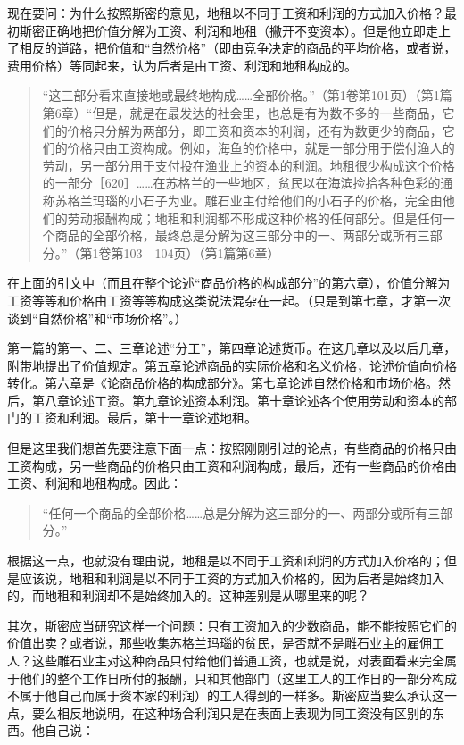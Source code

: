 现在要问：为什么按照斯密的意见，地租以不同于工资和利润的方式加入价格？最初斯密正确地把价值分解为工资、利润和地租（撇开不变资本）。但是他立即走上了相反的道路，把价值和“自然价格”（即由竞争决定的商品的平均价格，或者说，费用价格）等同起来，认为后者是由工资、利润和地租构成的。

\begin{quote}{“这三部分看来直接地或最终地构成……全部价格。”（第1卷第101页）（第1篇第6章）“但是，就是在最发达的社会里，也总是有为数不多的一些商品，它们的价格只分解为两部分，即工资和资本的利润，还有为数更少的商品，它们的价格只由工资构成。例如，海鱼的价格中，就是一部分用于偿付渔人的劳动，另一部分用于支付投在渔业上的资本的利润。地租很少构成这个价格的一部分［620］……在苏格兰的一些地区，贫民以在海滨捡拾各种色彩的通称苏格兰玛瑙的小石子为业。雕石业主付给他们的小石子的价格，完全由他们的劳动报酬构成；地租和利润都不形成这种价格的任何部分。但是任何一个商品的全部价格，最终总是分解为这三部分中的一、两部分或所有三部分。”（第1卷第103—104页）（第1篇第6章）}\end{quote}

在上面的引文中（而且在整个论述“商品价格的构成部分”的第六章），价值分解为工资等等和价格由工资等等构成这类说法混杂在一起。（只是到第七章，才第一次谈到“自然价格”和“市场价格”。）

第一篇的第一、二、三章论述“分工”，第四章论述货币。在这几章以及以后几章，附带地提出了价值规定。第五章论述商品的实际价格和名义价格，论述价值向价格转化。第六章是《论商品价格的构成部分》。第七章论述自然价格和市场价格。然后，第八章论述工资。第九章论述资本利润。第十章论述各个使用劳动和资本的部门的工资和利润。最后，第十一章论述地租。

但是这里我们想首先要注意下面一点：按照刚刚引过的论点，有些商品的价格只由工资构成，另一些商品的价格只由工资和利润构成，最后，还有一些商品的价格由工资、利润和地租构成。因此：

\begin{quote}{“任何一个商品的全部价格……总是分解为这三部分的一、两部分或所有三部分。”}\end{quote}

根据这一点，也就没有理由说，地租是以不同于工资和利润的方式加入价格的；但是应该说，地租和利润是以不同于工资的方式加入价格的，因为后者是始终加入的，而地租和利润却不是始终加入的。这种差别是从哪里来的呢？

其次，斯密应当研究这样一个问题：只有工资加入的少数商品，能不能按照它们的价值出卖？或者说，那些收集苏格兰玛瑙的贫民，是否就不是雕石业主的雇佣工人？这些雕石业主对这种商品只付给他们普通工资，也就是说，对表面看来完全属于他们的整个工作日所付的报酬，只和其他部门（这里工人的工作日的一部分构成不属于他自己而属于资本家的利润）的工人得到的一样多。斯密应当要么承认这一点，要么相反地说明，在这种场合利润只是在表面上表现为同工资没有区别的东西。他自己说：

